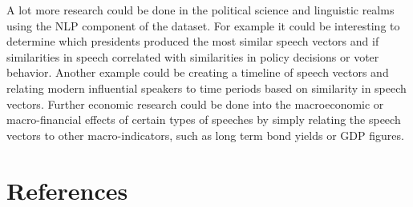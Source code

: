 \documentclass[11pt,preprint, authoryear]{elsarticle}
\numberwithin{equation}{section}
\numberwithin{figure}{section}
\numberwithin{table}{section}
\begin{document}
A lot more research could be done in the political science and
linguistic realms using the NLP component of the dataset. For example it
could be interesting to determine which presidents produced the most
similar speech vectors and if similarities in speech correlated with
similarities in policy decisions or voter behavior. Another example
could be creating a timeline of speech vectors and relating modern
influential speakers to time periods based on similarity in speech
vectors. Further economic research could be done into the macroeconomic
or macro-financial effects of certain types of speeches by simply
relating the speech vectors to other macro-indicators, such as long term
bond yields or GDP figures.

\newpage

\hypertarget{references}{%
\section*{References}\label{references}}
\end{document}
